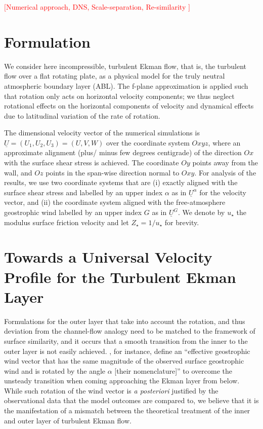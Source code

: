 \documentclass[a4paper,11pt]{amsart}
\newcommand{\todo}[1]{\textcolor{red}{$[$#1$]$}}
\begin{document}
\todo{Numerical approach, DNS, Scale-separation, Re-similarity
  \citep{dimotakis:JFM2000, dasilva:ARF2014, pope:2000, moin:ARF1998, mellado:JAM2018}}
%
\section{Formulation}
%
We consider here incompressible, turbulent Ekman flow, that is, the turbulent flow over a flat rotating plate, as
a physical model for the truly neutral atmospheric boundary layer (ABL).
%
The f-plane approximation is applied such that rotation only acts on horizontal velocity components;
we thus neglect rotational effects on the horizontal components of velocity and dynamical effects
due to latitudinal variation of the rate of rotation.
%
\par
%
The dimensional velocity vector of the numerical simulations is $\underline{U} = (U_1,U_2,U_3) = (U,V,W)$ over the coordinate system
$Oxyz$, where an approximate alignment (plus/ minus few degrees centigrade) of the direction $Ox$ with the surface shear stress is achieved.
The coordinate $Oy$ points away from the wall,  and $Oz$ points in the span-wise direction normal to $Oxy$. 
%
For analysis of the results, we use two coordinate systems that are
(i)  exactly aligned with the surface shear stress and labelled by an upper index $\alpha$ as in $\underline{U}^\alpha$ for the velocity vector, and
(ii) the coordinate system aligned with the free-atmosphere geostrophic wind labelled by an upper index $G$ as in $\underline{U}^G$.
%
We denote by $u_\star$ the modulus surface friction velocity and let $Z_\star=1/u_\star$ for brevity. 

\section{Towards a Universal Velocity Profile for the Turbulent Ekman Layer}

Formulations for the outer layer that take into account the rotation, and thus deviation from the channel-flow analogy
need to be matched to the framework of surface similarity, and it
occurs that a smooth transition from the inner to the outer layer is not easily achieved.
%
\cite{optis:BM2014}, for instance, define an ``effective geostrophic wind vector that has the same magnitude of the
observed surface geostrophic wind and is rotated by the angle $\alpha$ [their nomenclature]'' to overcome the
unsteady transition when coming approaching the Ekman layer from below.
%
While such rotation of the wind vector is \emph{a posteriori} justified by the observational data that the model outcomes are compared to,
we believe that it is the manifestation of a mismatch between the theoretical treatment of the inner and outer layer of
turbulent Ekman flow.
\end{document}

